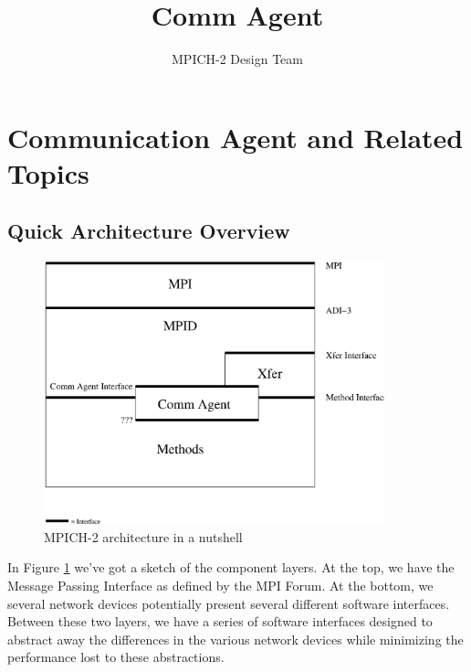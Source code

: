 \documentclass[11pt,letterpaper]{article}
\begin{document}
\date{}

\title{Comm Agent}

\author{MPICH-2 Design Team}

\maketitle

\thispagestyle{empty}

\section{Communication Agent and Related Topics}


\subsection{Quick Architecture Overview}

\begin{figure}
\begin{center}
\includegraphics[height=3in]{mpich2-arch.eps}
\caption{\label{fig:arch} MPICH-2 architecture in a nutshell}
\end{center}
\end{figure}



In Figure \ref{fig:arch} we've got a sketch of the component layers.
At the top, we have the Message Passing Interface as defined by the
MPI Forum.  At the bottom, we several network devices potentially
present several different software interfaces.  Between these two
layers, we have a series of software interfaces designed to abstract
away the differences in the various network devices while minimizing
the performance lost to these abstractions.
\end{document}
